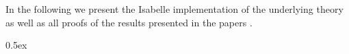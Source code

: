\documentclass[11pt,a4paper]{article}
\begin{document}
\noindent
In the following we present the Isabelle implementation of the underlying theory as well as all proofs of the results presented in the papers \cite{BartlGP26-encodability, PetersGlabbeek15-encodability}.

\newpage
\tableofcontents
\newpage

\parindent 0pt\parskip 0.5ex





\end{document}
